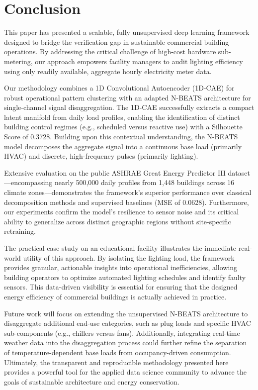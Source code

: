 \section{Conclusion}

This paper has presented a scalable, fully unsupervised deep learning framework designed to bridge the verification gap in sustainable commercial building operations. By addressing the critical challenge of high-cost hardware sub-metering, our approach empowers facility managers to audit lighting efficiency using only readily available, aggregate hourly electricity meter data.

Our methodology combines a 1D Convolutional Autoencoder (1D-CAE) for robust operational pattern clustering with an adapted N-BEATS architecture for single-channel signal disaggregation. The 1D-CAE successfully extracts a compact latent manifold from daily load profiles, enabling the identification of distinct building control regimes (e.g., scheduled versus reactive use) with a Silhouette Score of 0.3728. Building upon this contextual understanding, the N-BEATS model decomposes the aggregate signal into a continuous base load (primarily HVAC) and discrete, high-frequency pulses (primarily lighting).

Extensive evaluation on the public ASHRAE Great Energy Predictor III dataset—encompassing nearly 500,000 daily profiles from 1,448 buildings across 16 climate zones—demonstrates the framework's superior performance over classical decomposition methods and supervised baselines (MSE of 0.0628). Furthermore, our experiments confirm the model's resilience to sensor noise and its critical ability to generalize across distinct geographic regions without site-specific retraining.

The practical case study on an educational facility illustrates the immediate real-world utility of this approach. By isolating the lighting load, the framework provides granular, actionable insights into operational inefficiencies, allowing building operators to optimize automated lighting schedules and identify faulty sensors. This data-driven visibility is essential for ensuring that the designed energy efficiency of commercial buildings is actually achieved in practice.

Future work will focus on extending the unsupervised N-BEATS architecture to disaggregate additional end-use categories, such as plug loads and specific HVAC sub-components (e.g., chillers versus fans). Additionally, integrating real-time weather data into the disaggregation process could further refine the separation of temperature-dependent base loads from occupancy-driven consumption. Ultimately, the transparent and reproducible methodology presented here provides a powerful tool for the applied data science community to advance the goals of sustainable architecture and energy conservation.

